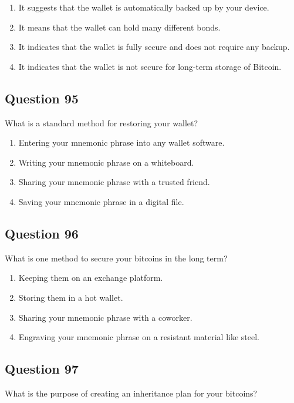 \documentclass[12pt,a4paper]{article}
\begin{document}
\begin{enumerate}[label=\Alph*., leftmargin=*]
\item It suggests that the wallet is automatically backed up by your device.
\item It means that the wallet can hold many different bonds.
\item It indicates that the wallet is fully secure and does not require any backup.
\item It indicates that the wallet is not secure for long-term storage of Bitcoin.
\end{enumerate}

\bigskip


\subsection*{Question 95}
What is a standard method for restoring your wallet?

\begin{enumerate}[label=\Alph*., leftmargin=*]
\item Entering your mnemonic phrase into any wallet software.
\item Writing your mnemonic phrase on a whiteboard.
\item Sharing your mnemonic phrase with a trusted friend.
\item Saving your mnemonic phrase in a digital file.
\end{enumerate}

\bigskip


\subsection*{Question 96}
What is one method to secure your bitcoins in the long term?

\begin{enumerate}[label=\Alph*., leftmargin=*]
\item Keeping them on an exchange platform.
\item Storing them in a hot wallet.
\item Sharing your mnemonic phrase with a coworker.
\item Engraving your mnemonic phrase on a resistant material like steel.
\end{enumerate}

\bigskip


\subsection*{Question 97}
What is the purpose of creating an inheritance plan for your bitcoins?
\end{document}
